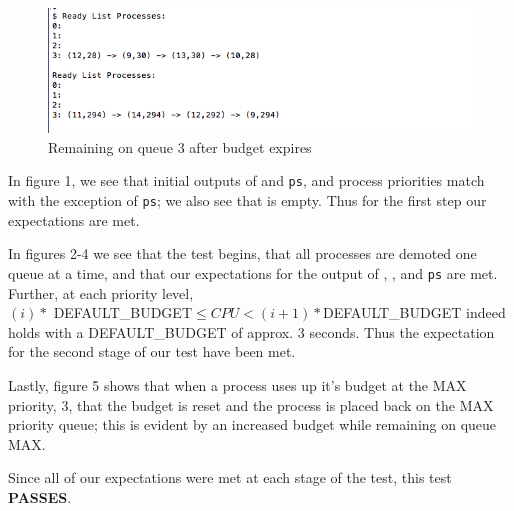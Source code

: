 \documentclass[11pt,letterpaper]{report}
\begin{document}
\begin{figure}[h]
\centering
\includegraphics[width=0.6\linewidth]{demotion-4.png}
\caption{Remaining on queue 3 after budget expires}
\label{fig:5}
\end{figure}

\newpage

In figure 1, we see that initial outputs of  and {\tt ps}, and process priorities match with the exception of {\tt ps}; we also see that  is empty. Thus for the first step our expectations
are met. 

In figures 2-4 we see that the test begins, that all processes are demoted one queue at a time, and that our expectations for the output of , , and {\tt ps} are met. Further, at each 
priority level, \\ $(i) *$ DEFAULT\_BUDGET$ \leq CPU < (i+1) * $DEFAULT\_BUDGET indeed holds with a DEFAULT\_BUDGET of approx. 3 seconds. Thus the expectation for 
the second stage of our test have been met. 

Lastly, figure 5 shows that when a process uses up it's budget at the MAX priority, 3, that the budget is reset and the process is placed back on the MAX priority queue; this is evident by an increased budget while remaining on queue MAX.

Since all of our expectations were met at each stage of the test, this test \textbf{PASSES}.
\end{document}

